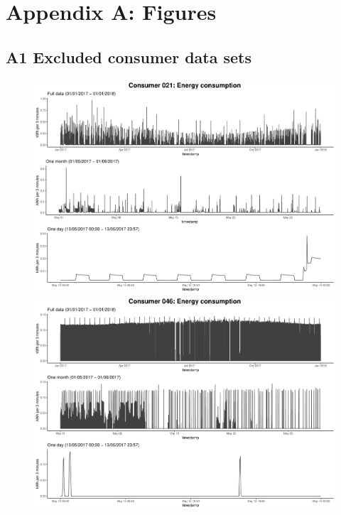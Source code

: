 
\section*{Appendix \hypertarget{AppA:Figures}{A}: Figures} \label{App:Figures}

\subsection*{\hypertarget{AppA1:Figures:Excludedc}{A1} Excluded consumer data sets}\label{AppA1:Figures:Excludedc}

\begin{centering}
\begin{figure}[!htbp]
        \includegraphics[width=\textwidth-0.85cm]{thesis/graphs/timeseries/c021_cons.pdf}\vspace{0.3cm}
        \includegraphics[width=\textwidth-0.85cm]{thesis/graphs/timeseries/c046_cons.pdf}

\end{figure}
\end{centering}

